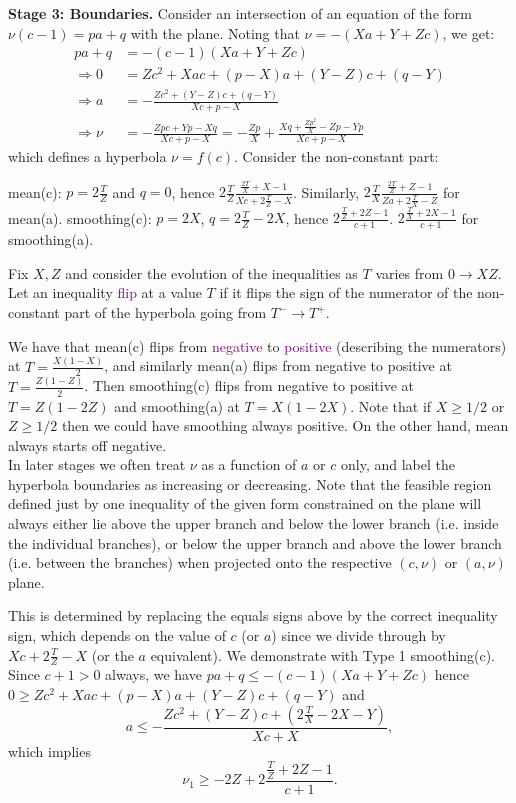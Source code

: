 \documentclass[11pt]{article}
\newcommand{\purp}[1]{\textcolor{purple}{#1}}
\begin{document}
\textbf{Stage 3: Boundaries.} Consider an intersection of an equation of the form $\nu(c-1) = pa + q$ with the plane. Noting that $\nu = -(Xa + Y + Zc)$, we get:
\begin{align*}
    pa + q &= -(c-1)(Xa + Y + Zc) \\
    \Rightarrow 0 &= Zc^2 + Xac + (p-X)a + (Y-Z)c + (q-Y) \\
    \Rightarrow a &= - \frac{Zc^2 + (Y-Z)c + (q-Y)}{Xc + p - X} \\
    \Rightarrow \nu &= -\frac{Zpc + Yp - Xq}{Xc + p - X} = -\frac{Zp}{X} + \frac{Xq + \frac{Zp^2}{X} - Zp - Yp}{Xc + p - X}
\end{align*}
which defines a hyperbola $\nu = f(c)$. Consider the non-constant part:
\begin{outline}
    \1 mean(c): $p = 2\frac{T}{Z}$ and $q = 0$, hence $2\frac{T}{Z}\frac{\frac{2T}{X} + X - 1}{Xc + 2\frac{T}{Z} - X}$. Similarly, $2\frac{T}{X} \frac{\frac{2T}{Z} + Z - 1}{Za + 2\frac{T}{X} - Z}$ for mean(a). 
    \1 smoothing(c): $p = 2X$, $q = 2\frac{T}{Z}-2X$, hence $2\frac{\frac{T}{Z}+2Z-1}{c+1}$. $2\frac{\frac{T}{X}+2X-1}{c+1}$ for smoothing(a). 
\end{outline}
Fix $X, Z$ and consider the evolution of the inequalities as $T$ varies from $0 \to XZ$. Let an inequality \purp{flip} at a value $T$ if it flips the sign of the numerator of the non-constant part of the hyperbola going from $T^- \to T^+$. 

We have that mean(c) flips from \purp{negative} to \purp{positive} (describing the numerators) at $T = \frac{X(1-X)}{2}$, and similarly mean(a) flips from negative to positive at $T = \frac{Z(1-Z)}{2}$. Then smoothing(c) flips from negative to positive at $T = Z(1-2Z)$ and smoothing(a) at $T = X(1-2X)$. Note that if $X \ge 1/2$ or $Z \ge 1/2$ then we could have smoothing always positive. On the other hand, mean always starts off negative. \\

In later stages we often treat $\nu$ as a function of $a$ or $c$ only, and label the hyperbola boundaries as increasing or decreasing. Note that the feasible region defined just by one inequality of the given form constrained on the plane will always either lie above the upper branch and below the lower branch (i.e. inside the individual branches), or below the upper branch and above the lower branch (i.e. between the branches) when projected onto the respective $(c,\nu)$ or $(a,\nu)$ plane. 

This is determined by replacing the equals signs above by the correct inequality sign, which depends on the value of $c$ (or $a$) since we divide through by $Xc + 2\frac{T}{Z} - X$ (or the $a$ equivalent). We demonstrate with Type 1 smoothing(c). Since $c + 1 > 0$ always, we have $pa + q \le -(c-1)(Xa + Y + Zc)$ hence $0 \ge Zc^2 + Xac + (p-X)a + (Y-Z)c + (q-Y)$ and
\[a \le -\frac{Zc^2 + (Y-Z)c + (2\frac{T}{X} - 2X - Y)}{Xc + X},\]
which implies
\[\nu_1 \ge -2Z + 2\frac{\frac{T}{Z} + 2Z - 1}{c+1}.\]
\end{document}
